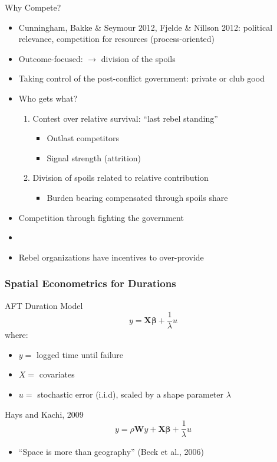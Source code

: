 \documentclass{beamer}
\begin{document}
\begin{frame}{Why Compete?}
\begin{itemize}
\item Cunningham, Bakke \& Seymour 2012, Fjelde \& Nillson 2012: political relevance, competition for resources (process-oriented)
\item Outcome-focused: $\rightarrow$ division of the spoils
\item Taking control of the post-conflict government: private or club good
\item Who gets what? 
\begin{enumerate}
\item Contest over relative survival: ``last rebel standing''
\begin{itemize}
\item Outlast competitors
\item Signal strength (attrition)
\end{itemize}
\item Division of spoils related to relative contribution
\begin{itemize}
\item Burden bearing compensated through spoils share
\end{itemize}
\end{enumerate}
\item Competition through fighting the government
\item[]
\item[$\rightarrow$] Rebel organizations have incentives to over-provide
\end{itemize}
\end{frame} 




\begin{frame}
\frametitle{Spatial Econometrics for Durations}

AFT Duration Model
\begin{equation}
y=\mathbf{X\beta} +\frac{1}{\lambda}u 
\end{equation}
where:
\begin{itemize}
\item $y=$ logged time until failure
\item $X=$ covariates
\item $u=$ stochastic error (i.i.d), scaled by a shape parameter $\lambda$
\end{itemize}
Hays and Kachi, 2009
\begin{equation}
y=\rho{\mathbf{W}y} +\mathbf{X\beta} +\frac{1}{\lambda}u
\end{equation}
\begin{itemize}
\item ``Space is more than geography'' (Beck et al., 2006)
\end{itemize}
\end{frame}
\end{document}
